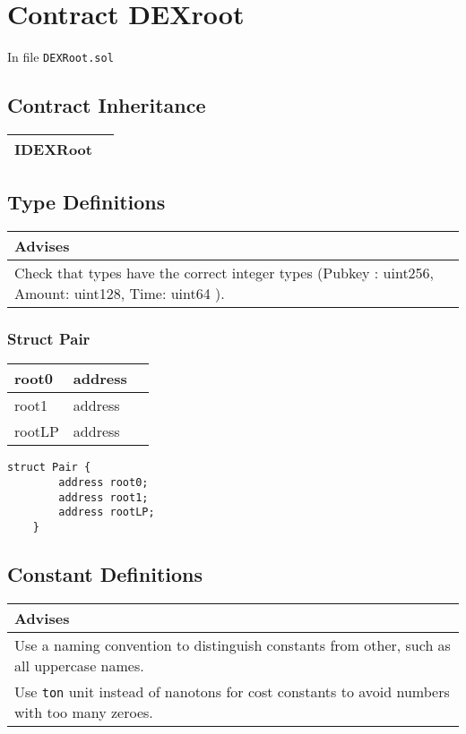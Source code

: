 
\chapter{Contract DEXroot}


In file {\tt DEXRoot.sol}

\section{Contract Inheritance}


\noindent\begin{tabular}{|l|p{5cm}|}\hline
IDEXRoot & \\\hline
\end{tabular}


\section{Type Definitions}


\ifsoldraft
\noindent\begin{tabular}{|p{12cm}|}\hline
\rowcolor{green}Advises
\\\hline
Check that types have the correct integer types (Pubkey : uint256, Amount: uint128, Time: uint64 ).
\\\hline\end{tabular}
\fi

\subsection{Struct Pair}


\ifsoltables
\noindent\begin{tabular}{|l|l|p{6cm}|}\hline
root0 & address & \\\hline
root1 & address & \\\hline
rootLP & address & \\\hline
\end{tabular}
\fi


\begin{lstlisting}[firstnumber=24]
	struct Pair {
		address root0;
		address root1;
		address rootLP;
	}
\end{lstlisting}

\section{Constant Definitions}


\ifsoldraft
\noindent\begin{tabular}{|p{12cm}|}\hline
\rowcolor{green}Advises
\\\hline
Use a naming convention to distinguish constants from other, such as all uppercase names.
\\\hline
Use \verb+ton+ unit instead of nanotons for cost constants to avoid numbers with too many zeroes.
\\\hline\end{tabular}
\fi

